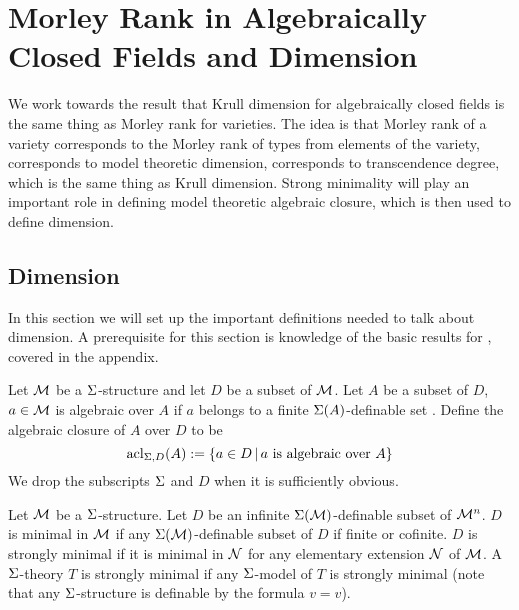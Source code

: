 \section{Morley Rank in Algebraically Closed Fields and Dimension}

We work towards the result that Krull dimension for algebraically closed 
fields is the same thing as Morley rank for varieties. 
The idea is that Morley rank of a variety corresponds to the Morley rank of 
types from elements of the variety, corresponds to model theoretic dimension,
corresponds to transcendence degree, 
which is the same thing as Krull dimension.
Strong minimality will play an important role in defining 
model theoretic algebraic closure,
which is then used to define dimension.

\subsection{Dimension}
In this section we will set up the important definitions needed to 
talk about dimension. 
A prerequisite for this section is knowledge of the basic results for 
, covered in the appendix.
\begin{dfn}
    Let $\mathcal{M}$ be a $\Sigma$-structure and let $D$ be a subset of $\mathcal{M}$.
    Let $A$ be a subset of $D$, 
    $a \in \mathcal{M}$ is algebraic over $A$ if $a$ belongs to a finite 
    $\Sigma(A)$-definable set .
    Define the algebraic closure of $A$ over $D$ to be
    \[\operatorname{acl}_{\Sigma,D}(A) := \left\{a \in D \,|\, a \text{ is algebraic over } A\right\}\]
    We drop the subscripts $\Sigma$ and $D$ when it is sufficiently obvious.
\end{dfn}

\begin{dfn}
    Let $\mathcal{M}$ be a $\Sigma$-structure.
    Let $D$ be an infinite $\Sigma(\mathcal{M})$-definable subset of $\mathcal{M}^n$.
    $D$ is minimal in $\mathcal{M}$ if any $\Sigma(\mathcal{M})$-definable subset of $D$
    if finite or cofinite.
    $D$ is strongly minimal if it is minimal in 
    $\mathcal{N}$ for any elementary extension $\mathcal{N}$ of $\mathcal{M}$.
    A $\Sigma$-theory $T$ is strongly minimal if any $\Sigma$-model of $T$
    is strongly minimal 
    (note that any $\Sigma$-structure is definable by the formula $v = v$).
\end{dfn}

